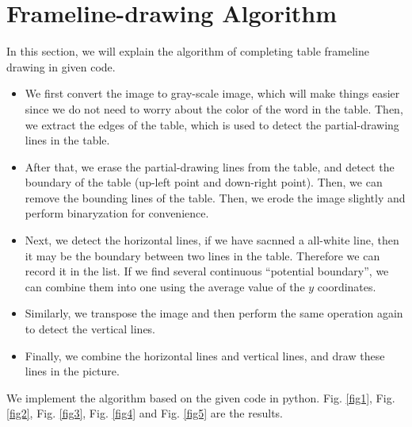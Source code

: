 \documentclass[12pt, a4paper]{article}
\theoremstyle{definition}
\begin{document}
\section{Frameline-drawing Algorithm}\label{section2}
In this section, we will explain the algorithm of completing table frameline drawing in given code.

\begin{itemize}
	\item We first convert the image to gray-scale image, which will make things easier since we do not need to worry about the color of the word in the table. Then, we extract the edges of the table, which is used to detect the partial-drawing lines in the table.
	\item After that, we erase the partial-drawing lines from the table, and detect the boundary of the table (up-left point and down-right point). Then, we can remove the bounding lines of the table. Then, we erode the image slightly and perform binaryzation for convenience.
	\item Next, we detect the horizontal lines, if we have sacnned a all-white line, then it may be the boundary between two lines in the table. Therefore we can record it in the list. If we find several continuous ``potential boundary'', we can combine them into one using the average value of the $y$ coordinates.
	\item Similarly, we transpose the image and then perform the same operation again to detect the vertical lines.
	\item Finally, we combine the horizontal lines and vertical lines, and draw these lines in the picture.
\end{itemize}

We implement the algorithm based on the given code in python. Fig. \ref{fig1}, Fig. \ref{fig2}, Fig. \ref{fig3}, Fig. \ref{fig4} and Fig. \ref{fig5} are the results.
\end{document}
